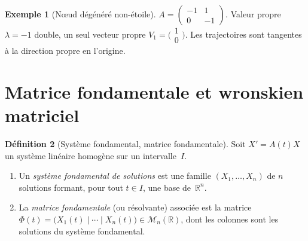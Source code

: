 \documentclass[12pt,a4paper,openany]{book}
\theoremstyle{definition}
\newtheorem{definition}{Définition}[chapter]
\newtheorem{exemple}[definition]{Exemple}
\theoremstyle{plain}
\theoremstyle{remark}
\newcommand{\R}{\mathbb{R}}
\begin{document}
\begin{exemple}[N\oe ud dégénéré non-étoile]\label{ex:noeud-non-etoile}
  $A = \begin{pmatrix} -1 & 1 \\ 0 & -1 \end{pmatrix}$.
  Valeur propre $\lambda = -1$ double, un seul vecteur propre
  $V_1 = \bigl(\begin{smallmatrix}1\\0\end{smallmatrix}\bigr)$.
  Les trajectoires sont tangentes à la direction propre en l'origine.
\end{exemple}

\begin{center}
\end{center}

\section{Matrice fondamentale et wronskien matriciel}\label{sec:matrice-fondamentale}

\begin{definition}[Système fondamental, matrice fondamentale]\label{def:matrice-fondamentale}
  Soit $X' = A(t)X$ un système linéaire homogène sur un intervalle~$I$.
  \begin{enumerate}[label=(\roman*)]
    \item Un \emph{système fondamental de solutions} est une famille
      $(X_1,\ldots,X_n)$ de $n$ solutions formant, pour tout
      $t \in I$, une base de~$\R^n$.
    \item La \emph{matrice fondamentale} (ou résolvante) associée est
      la matrice $\Phi(t) = \bigl(X_1(t) \mid \cdots \mid X_n(t)\bigr)
      \in \mathcal{M}_n(\R)$, dont les colonnes sont les solutions
      du système fondamental.
  \end{enumerate}
\end{definition}
\end{document}
